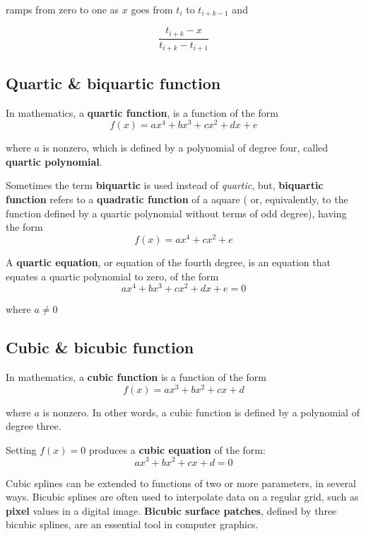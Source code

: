 ramps from zero to one as $ x $ goes from $ t_i $ to $ t_{i+k-1} $ and 

\begin{equation}
\dfrac{t_{i+k}-x}{t_{i+k}-t_{i+1}}
\end{equation}

\subsection{Quartic \& biquartic function}
In mathematics, a \textbf{quartic function}, is a function of the form
\begin{equation}
f(x) = a x^4 + b x^3 + c x^2 + d x + e
\end{equation}

where $ a $ is nonzero, which is defined by a polynomial of degree four, called \textbf{quartic polynomial}.

Sometimes the term \textbf{biquartic} is used instead of \textit{quartic}, but, \textbf{biquartic function} refers to a \textbf{quadratic function} of a aquare ( or, equivalently, to the function defined by a quartic polynomial without terms of odd degree), having the form
\begin{equation}
f(x) = a x^4 + c x^2 + e
\end{equation}

A \textbf{quartic equation}, or equation of the fourth degree, is an equation that equates a quartic polynomial to zero, of the form
\begin{equation}
a x^4 + b x^3 + c x^2 + dx + e = 0
\end{equation}

where $ a \neq 0 $

\subsection{Cubic \& bicubic function}
In mathematics, a \textbf{cubic function} is a function of the form
\begin{equation}
f(x) = a x^3 + b x^2 + c x + d
\end{equation}

where $ a $ is nonzero. In other words, a cubic function is defined by a polynomial of degree three.

Setting $ f(x) = 0 $ produces a \textbf{cubic equation} of the form:
\begin{equation}
a x^3 + b x^2 + c x + d = 0
\end{equation}

Cubic splines can be extended to functions of two or more parameters, in several ways. Bicubic splines are often used to interpolate data on a regular grid, such as \textbf{pixel} values in a digital image. \textbf{Bicubic surface patches}, defined by three bicubic splines, are an essential tool in computer graphics.

